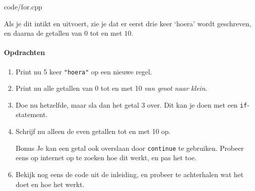 \documentclass[12pt,a4paper]{article}
\newcommand{\code}{}
\newcommand{\icode}{\lstinline}
\begin{document}
\code{code/for.cpp}

Als je dit intikt en uitvoert, zie je dat er eerst drie keer `hoera' wordt geschreven, en daarna de getallen van $0$ tot en met $10$.

\paragraph{Opdrachten}
\begin{enumerate}
	\item
		Print nu 5 keer \icode{"hoera"} op een nieuwe regel.
    \item 
        Print nu alle getallen van 0 tot en met 10 \textit{van groot naar klein}.
	\item
		Doe nu hetzelfde, maar sla dan het getal 3 over. Dit kan je doen met een \icode{if}-statement.
	\item
		Schrijf nu alleen de even getallen tot en met 10 op.
	\item[Bonus] 
		Je kan een getal ook overslaan door \icode{continue} te gebruiken.
		Probeer eens op internet op te zoeken hoe dit werkt, en pas het toe.
	\item
		Bekijk nog eens de code uit de inleiding, en probeer te achterhalen wat het doet en hoe het werkt.
\end{enumerate}

\clearpage
\clearpage
\end{document}
